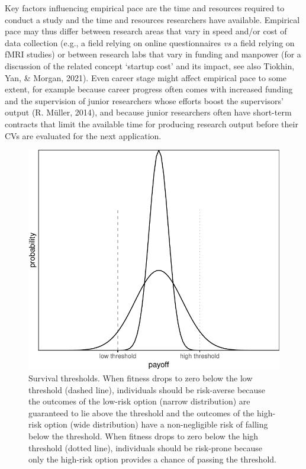 \documentclass[
  ,man,mask,floatsintext]{apa6}
\begin{document}
Key factors influencing empirical pace are the time and resources required to conduct a study and the time and resources researchers have available.
Empirical pace may thus differ between research areas that vary in speed and/or cost of data collection (e.g., a field relying on online questionnaires \emph{vs} a field relying on fMRI studies) or between research labs that vary in funding and manpower (for a discussion of the related concept `startup cost' and its impact, see also Tiokhin, Yan, \& Morgan, 2021).
Even career stage might affect empirical pace to some extent, for example because career progress often comes with increased funding and the supervision of junior researchers whose efforts boost the supervisors' output (R. Müller, 2014), and because junior researchers often have short-term contracts that limit the available time for producing research output before their CVs are evaluated for the next application.



\begin{figure}

{\centering \includegraphics[width=0.6\linewidth]{rr-risk-sensitivity_files/figure-latex/varianceplot-1} 

}

\caption{Survival thresholds. When fitness drops to zero below the low threshold (dashed line), individuals should be risk-averse because the outcomes of the low-risk option (narrow distribution) are guaranteed to lie above the threshold and the outcomes of the high-risk option (wide distribution) have a non-negligible risk of falling below the threshold. When fitness drops to zero below the high threshold (dotted line), individuals should be risk-prone because only the high-risk option provides a chance of passing the threshold.}\label{fig:varianceplot}
\end{figure}
\end{document}
